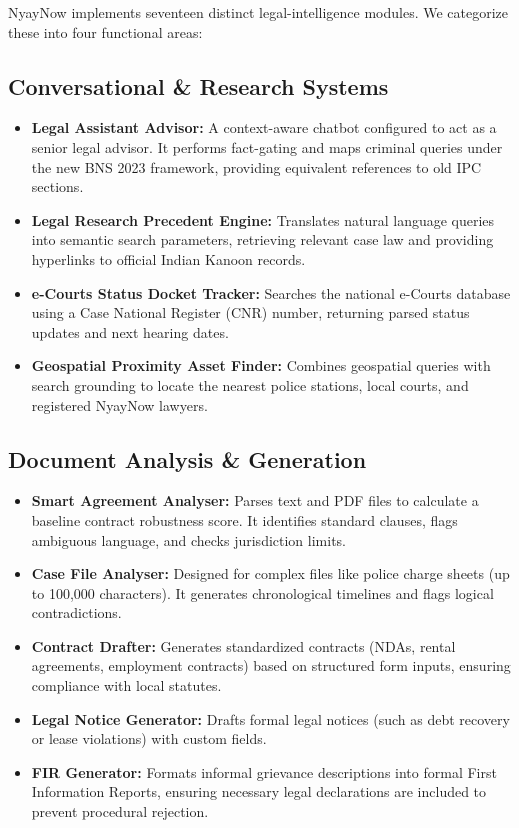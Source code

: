 \documentclass[conference]{IEEEtran}
\begin{document}
NyayNow implements seventeen distinct legal-intelligence modules. We categorize these into four functional areas:

\subsection{Conversational \& Research Systems}
\begin{itemize}[leftmargin=*]
  \item \textbf{Legal Assistant Advisor:} A context-aware chatbot configured to act as a senior legal advisor. It performs fact-gating and maps criminal queries under the new BNS 2023 framework, providing equivalent references to old IPC sections.
  \item \textbf{Legal Research Precedent Engine:} Translates natural language queries into semantic search parameters, retrieving relevant case law and providing hyperlinks to official Indian Kanoon records.
  \item \textbf{e-Courts Status Docket Tracker:} Searches the national e-Courts database using a Case National Register (CNR) number, returning parsed status updates and next hearing dates.
  \item \textbf{Geospatial Proximity Asset Finder:} Combines geospatial queries with search grounding to locate the nearest police stations, local courts, and registered NyayNow lawyers.
\end{itemize}

\subsection{Document Analysis \& Generation}
\begin{itemize}[leftmargin=*]
  \item \textbf{Smart Agreement Analyser:} Parses text and PDF files to calculate a baseline contract robustness score. It identifies standard clauses, flags ambiguous language, and checks jurisdiction limits.
  \item \textbf{Case File Analyser:} Designed for complex files like police charge sheets (up to 100,000 characters). It generates chronological timelines and flags logical contradictions.
  \item \textbf{Contract Drafter:} Generates standardized contracts (NDAs, rental agreements, employment contracts) based on structured form inputs, ensuring compliance with local statutes.
  \item \textbf{Legal Notice Generator:} Drafts formal legal notices (such as debt recovery or lease violations) with custom fields.
  \item \textbf{FIR Generator:} Formats informal grievance descriptions into formal First Information Reports, ensuring necessary legal declarations are included to prevent procedural rejection.
\end{itemize}
\end{document}

